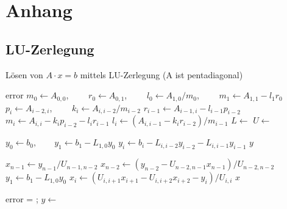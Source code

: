 \chapter{Anhang}

\section{LU-Zerlegung}
\begin{Algorithmus}[H]
\caption{Lösen von $A\cdot x = b$ mittels LU-Zerlegung (A ist pentadiagonal)}
\label{alg:LU}
{
\footnotesize
	\begin{algorithmic}
	    \State \Return error
	\EndIf
    \State $m_0 \gets A_{0,0}$, $\qquad r_0 \gets A_{0,1}$, $\qquad l_0 \gets A_{1,0}/m_0$, $ \qquad m_1 \gets A_{1,1}- l_1r_0$
        \State $p_i \gets A_{i-2,i}$, $\qquad k_i \gets A_{i,i-2}/m_{i-2}$
        \State $r_{i-1} \gets A_{i-1,i} - l_{i-1}  p_{i-2}$
        \State $m_i \gets A_{i,i} - k_i p_{i-2} - l_i  r_{i-1}$
        \State $l_i \gets (A_{i,i-1}-k_i r_{i-2})/m_{i-1}$
    \EndFor
    \State $L \gets $         
    \State $U \gets $    
    \State \Return [L, U]
\EndFunction

        \State $y_0 \gets b_0, \qquad y_1 \gets b_1 - L_{1,0} y_0$
            \State $y_i \gets b_i - L_{i,i-2} y_{i-2} - L_{i,i-1} y_{i-1}$
        \EndFor
        \State \Return $y$
\EndFunction

        \State $x_{n-1} \gets y_{n-1}/U_{n-1,n-2}$
        \State $x_{n-2} \gets (y_{n-2} - U_{n-2,n-1} x_{n-1})/U_{n-2,n-2}$
        \State $y_1 \gets b_1 - L_{1,0} y_0$
            \State $x_i \gets (U_{i,i+1} x_{i+1}- U_{i,i+2} x_{i+2} - y_i) / U_{i,i}$
        \EndFor
        \State \Return $x$
\EndFunction

	 \State \Return error	\EndIf
	\State [L,U] = ;
    \State $y \gets $ 
    \State \Return {} 
\EndFunction
\end{algorithmic}
}
\end{Algorithmus}

